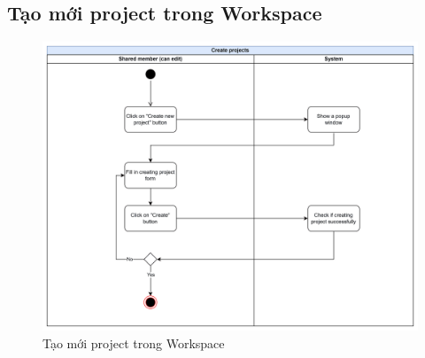 \subsection{Tạo mới project trong Workspace}
    \begin{figure}[H]
        \centering
        \includegraphics[width=\linewidth]{Content/Phân tích và thiết kế hệ thống/documents/Sơ đồ hoạt động/images/createProjects.png}
        \vspace{0.5cm}
        \caption{Tạo mới project trong Workspace}
        \label{fig:Tạo mới project trong Workspace}
    \end{figure}